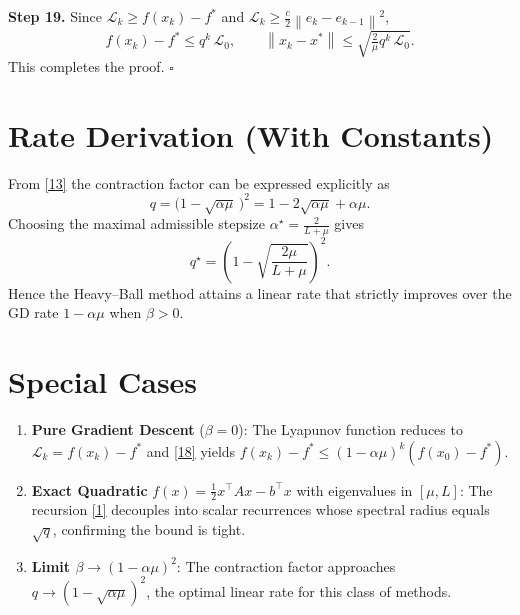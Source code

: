 \documentclass{article}
\newcommand{\norm}[1]{\left\lVert #1 \right\rVert}
\begin{document}
\noindent\textbf{Step 19.}  Since $\mathcal{L}_{k}\ge f(x_{k})-f^{*}$ and $\mathcal{L}_{k}\ge \frac{c}{2}\norm{e_{k}-e_{k-1}}^{2}$,
\[
f(x_{k})-f^{*}\le q^{k}\,\mathcal{L}_{0},
\qquad
\norm{x_{k}-x^{*}}\le \sqrt{\tfrac{2}{\mu}q^{k}\,\mathcal{L}_{0}}.
\tag{20}
\]
This completes the proof. \hfill $\square$

\section*{Rate Derivation (With Constants)}
From \eqref{13} the contraction factor can be expressed explicitly as
\[
q = \bigl(1-\sqrt{\alpha\mu}\,\bigr)^{2}
= 1-2\sqrt{\alpha\mu}+ \alpha\mu.
\]
Choosing the maximal admissible stepsize $\alpha^{\star}= \frac{2}{L+\mu}$ gives
\[
q^{\star}= \left(1-\sqrt{\frac{2\mu}{L+\mu}}\right)^{2}.
\]
Hence the Heavy–Ball method attains a linear rate that strictly improves over the GD rate $1-\alpha\mu$ when $\beta>0$.

\section*{Special Cases}
\begin{enumerate}
\item \textbf{Pure Gradient Descent} ($\beta=0$): The Lyapunov function reduces to $\mathcal{L}_{k}=f(x_{k})-f^{*}$ and \eqref{18} yields $f(x_{k})-f^{*}\le (1-\alpha\mu)^{k}(f(x_{0})-f^{*})$.
\item \textbf{Exact Quadratic} $f(x)=\tfrac12 x^{\top}Ax-b^{\top}x$ with eigenvalues in $[\mu,L]$: The recursion \eqref{1} decouples into scalar recurrences whose spectral radius equals $\sqrt{q}$, confirming the bound is tight.
\item \textbf{Limit $\beta\to (1-\alpha\mu)^{2}$}: The contraction factor approaches $q\to (1-\sqrt{\alpha\mu})^{2}$, the optimal linear rate for this class of methods.
\end{enumerate}
\end{document}
